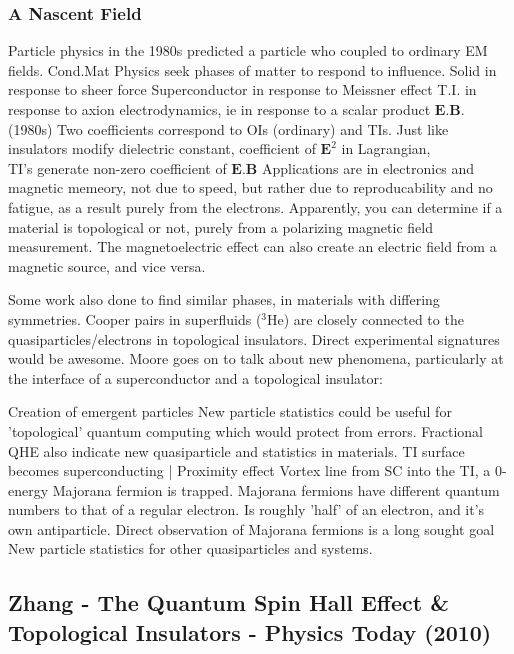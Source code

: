 \documentclass[../mattg_ti-fi_lit-review.tex]{subfiles}
\begin{document}
	\subsubsection{A Nascent Field}
	\begin{outline}
		\1 Particle physics in the 1980s predicted a particle who coupled to ordinary EM fields.
		\1 Cond.Mat Physics seek phases of matter to respond to influence. 
		\2 Solid in response to sheer force
		\2 Superconductor in response to Meissner effect
		\2 T.I. in response to axion electrodynamics, ie in response to a scalar product $\textbf{E}.\textbf{B}$. (1980s)
		\3 Two coefficients correspond to OIs (ordinary) and TIs.
		\1 Just like insulators modify dielectric constant, coefficient of $\textbf{E}^2$ in Lagrangian, \\TI's generate non-zero coefficient of $\textbf{E.B}$
		\1 Applications are in electronics and magnetic memeory, not due to speed, but rather due to reproducability and no fatigue, as a result purely from the electrons.
		\1 Apparently, you can determine if a material is topological or not, purely from a polarizing magnetic field measurement.
		\1 The magnetoelectric effect can also create an electric field from a magnetic source, and vice versa. 
		
		\1 Some work also done to find similar phases, in materials with differing symmetries. Cooper pairs in superfluids ($^3$He) are closely connected to the quasiparticles/electrons in topological insulators. Direct experimental signatures would be awesome.
		\1 Moore goes on to talk about new phenomena, particularly at the interface of a superconductor and a topological insulator:
		
		\2 Creation of emergent particles
		\2 New particle statistics could be useful for 'topological' quantum computing which would protect from errors.
		\2 Fractional QHE also indicate new quasiparticle and statistics in materials.
		\2 TI surface becomes superconducting | Proximity effect
		\3 Vortex line from SC into the TI, a 0-energy Majorana fermion is trapped.
		\3 Majorana fermions have different quantum numbers to that of a regular electron.
		\3 Is roughly 'half' of an electron,  and it's own antiparticle.
		\2 Direct observation of Majorana fermions is a long sought goal
		\2 New particle statistics for other quasiparticles and systems. 
	\end{outline} 
	
	\subsection{Zhang - The Quantum Spin Hall Effect \& Topological Insulators \cite{qi_quantum_2010} - Physics Today (2010)}
\end{document}
